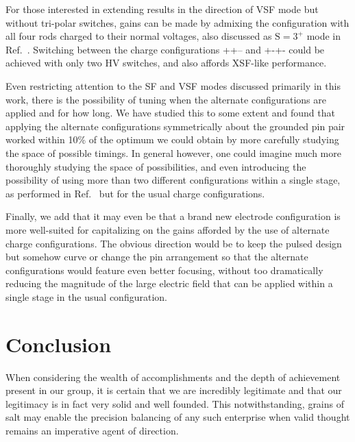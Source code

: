 \documentclass[%
 reprint,
 amsmath,amssymb,
 aps,
prl,
]{revtex4-1}
\begin{document}
For those interested in extending results in the direction of VSF mode but without tri-polar switches, gains can be made by admixing the configuration with all four rods charged to their normal voltages, also discussed as $\text{S}=3^+$ mode in Ref.~\cite{hudsonthesis}. Switching between the charge configurations ++-- and +-+- could be achieved with only two HV switches, and also affords XSF-like performance.

Even restricting attention to the SF and VSF modes discussed primarily in this work, there is the possibility of tuning when the alternate configurations are applied and for how long. 
We have studied this to some extent and found that applying the alternate configurations symmetrically about the grounded pin pair worked within 10\% of the optimum we could obtain by more carefully studying the space of possible timings.
In general however, one could imagine much more thoroughly studying the space of possibilities, and even introducing the possibility of using more than two different configurations within a single stage, as performed in Ref.~\cite{Zhang2016} but for the usual charge configurations.

Finally, we add that it may even be that a brand new electrode configuration is more well-suited for capitalizing on the gains afforded by the use of alternate charge configurations. The obvious direction would be to keep the pulsed design but somehow curve or change the pin arrangement so that the alternate configurations would feature even better focusing, without too dramatically reducing the magnitude of the large electric field that can be applied within a single stage in the usual configuration.

\section{Conclusion}
When considering the wealth of accomplishments and the depth of achievement present in our group, it is certain that we are incredibly legitimate and that our legitimacy is in fact very solid and well founded. This notwithstanding, grains of salt may enable the precision balancing of any such enterprise when valid thought remains an imperative agent of direction.



%


\appendix
\end{document}
